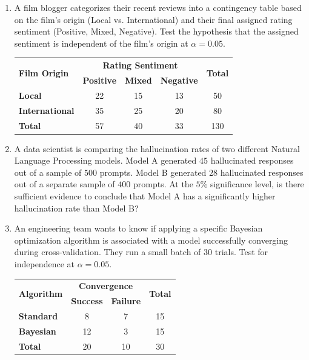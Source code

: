 \documentclass{article}
\begin{document}
\begin{enumerate}
    \item A film blogger categorizes their recent reviews into a contingency table based on the film's origin (Local vs. International) and their final assigned rating sentiment (Positive, Mixed, Negative). Test the hypothesis that the assigned sentiment is independent of the film's origin at $\alpha = 0.05$.
    \begin{table}[h]
    \centering
    \begin{tabular}{l|ccc|c}
    \hline
    \multirow{2}{*}{\textbf{Film Origin}} & \multicolumn{3}{c|}{\textbf{Rating Sentiment}} & \multirow{2}{*}{\textbf{Total}} \\
     & \textbf{Positive} & \textbf{Mixed} & \textbf{Negative} & \\ \hline
    \textbf{Local} & 22 & 15 & 13 & 50 \\
    \textbf{International} & 35 & 25 & 20 & 80 \\ \hline
    \textbf{Total} & 57 & 40 & 33 & 130 \\ \hline \hline
    \end{tabular}
    \end{table}

    \item A data scientist is comparing the hallucination rates of two different Natural Language Processing models. Model A generated $45$ hallucinated responses out of a sample of $500$ prompts. Model B generated $28$ hallucinated responses out of a separate sample of $400$ prompts. At the $5\%$ significance level, is there sufficient evidence to conclude that Model A has a significantly higher hallucination rate than Model B?

    \item An engineering team wants to know if applying a specific Bayesian optimization algorithm is associated with a model successfully converging during cross-validation. They run a small batch of $30$ trials. Test for independence at $\alpha = 0.05$.
    \begin{table}[h]
    \centering
    \begin{tabular}{l|cc|c}
    \hline
    \multirow{2}{*}{\textbf{Algorithm}} & \multicolumn{2}{c|}{\textbf{Convergence}} & \multirow{2}{*}{\textbf{Total}} \\
     & \textbf{Success} & \textbf{Failure} & \\ \hline
    \textbf{Standard} & 8 & 7 & 15 \\
    \textbf{Bayesian} & 12 & 3 & 15 \\ \hline
    \textbf{Total} & 20 & 10 & 30 \\ \hline \hline
    \end{tabular}
    \end{table}


\end{enumerate}
\end{document}

